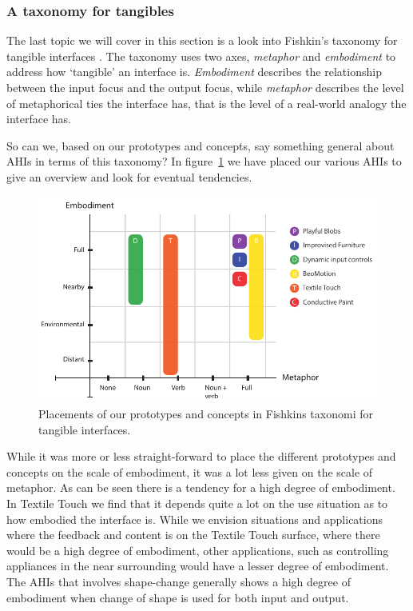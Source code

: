\subsubsection{A taxonomy for tangibles}
The last topic we will cover in this section is a look into Fishkin's taxonomy for tangible interfaces \citep{fishkin2004taxonomy}.
The taxonomy uses two axes, \emph{metaphor} and \emph{embodiment} to address how `tangible' an interface is.
\emph{Embodiment} describes the relationship between the input focus and the output focus, while \emph{metaphor} describes the level of metaphorical ties the interface has, that is the level of a real-world analogy the interface has.

So can we, based on our prototypes and concepts, say something general about AHIs in terms of this taxonomy?
In figure~\ref{fig:ch:adhoc2:fishkin} we have placed our various AHIs to give an overview and look for eventual tendencies. 

\begin{figure}[h]
  \centering
  \includegraphics[width=.9\textwidth]{figures/adhoc2/fishkin.pdf}
  \caption[Placements of our prototypes and concepts in Fishkins taxonomi]
  {Placements of our prototypes and concepts in Fishkins taxonomi for tangible interfaces.}
  \label{fig:ch:adhoc2:fishkin}
\end{figure}

While it was more or less straight-forward to place the different prototypes and concepts on the scale of embodiment, it was a lot less given on the scale of metaphor.
As can be seen there is a tendency for a high degree of embodiment.
In Textile Touch we find that it depends quite a lot on the use situation as to how embodied the interface is.
While we envision situations and applications where the feedback and content is on the Textile Touch surface, where there would be a high degree of embodiment, other applications, such as controlling appliances in the near surrounding would have a lesser degree of embodiment.
The AHIs that involves shape-change generally shows a high degree of embodiment when change of shape is used for both input and output.

